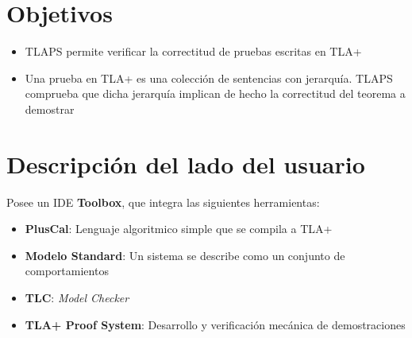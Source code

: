 \documentclass[12pt]{beamer}
\newenvironment{stepitemize}{\begin{itemize}[<+->]}{\end{itemize} }
\begin{document}
\begin{comment}
If 

\begin{stepitemize}
 \item $\varphi$ is an EFD,
 \item $\mathbf{A} \sat \varphi$ and 
 \item $\mathbf{B}$ is a daughter of $\mathbf{A}$
\end{stepitemize}

\pause

Then

\[ \mathbf{B} \sat \varphi \]


\end{frame}

\end{comment}

\section{Objetivos}
\begin{frame}
\begin{stepitemize}
 \item TLAPS permite verificar la correctitud de pruebas escritas en TLA+
 \item Una prueba en TLA+ es una colección de sentencias con jerarquía. TLAPS comprueba que dicha jerarquía implican de hecho la correctitud del teorema a demostrar
\end{stepitemize}
\end{frame}



\section{Descripción del lado del usuario}
\begin{frame}
    Posee un IDE \textbf{Toolbox}, que integra las siguientes herramientas:
      \begin{stepitemize}
	\item \textbf{PlusCal}: Lenguaje algoritmico simple que se compila a TLA+
	\item \textbf{Modelo Standard}: Un sistema se describe como un conjunto de comportamientos
	\item \textbf{TLC}: \textit{Model Checker}
	\item \textbf{TLA+ Proof System}: Desarrollo y verificación mecánica de demostraciones
      \end{stepitemize}

\end{frame}
\end{document}
